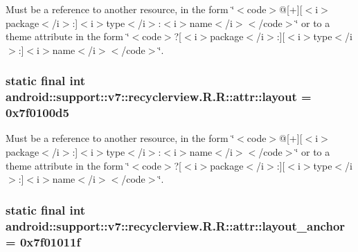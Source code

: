 Must be a reference to another resource, in the form \char`\"{}$<$code$>$@\mbox{[}+\mbox{]}\mbox{[}$<$i$>$package$<$/i$>$:\mbox{]}$<$i$>$type$<$/i$>$:$<$i$>$name$<$/i$>$$<$/code$>$\char`\"{} or to a theme attribute in the form \char`\"{}$<$code$>$?\mbox{[}$<$i$>$package$<$/i$>$:\mbox{]}\mbox{[}$<$i$>$type$<$/i$>$:\mbox{]}$<$i$>$name$<$/i$>$$<$/code$>$\char`\"{}. \hypertarget{classandroid_1_1support_1_1v7_1_1recyclerview_1_1_r_1_1attr_1b68afa3d9efed4db4b4035d66052220}{
\subsubsection[{layout}]{\setlength{\rightskip}{0pt plus 5cm}static final int android::support::v7::recyclerview.R.R::attr::layout = 0x7f0100d5}}
\label{classandroid_1_1support_1_1v7_1_1recyclerview_1_1_r_1_1attr_1b68afa3d9efed4db4b4035d66052220}


Must be a reference to another resource, in the form \char`\"{}$<$code$>$@\mbox{[}+\mbox{]}\mbox{[}$<$i$>$package$<$/i$>$:\mbox{]}$<$i$>$type$<$/i$>$:$<$i$>$name$<$/i$>$$<$/code$>$\char`\"{} or to a theme attribute in the form \char`\"{}$<$code$>$?\mbox{[}$<$i$>$package$<$/i$>$:\mbox{]}\mbox{[}$<$i$>$type$<$/i$>$:\mbox{]}$<$i$>$name$<$/i$>$$<$/code$>$\char`\"{}. \hypertarget{classandroid_1_1support_1_1v7_1_1recyclerview_1_1_r_1_1attr_8119ca28ef1636398a40c2d56e3d2e59}{
\subsubsection[{layout\_\-anchor}]{\setlength{\rightskip}{0pt plus 5cm}static final int android::support::v7::recyclerview.R.R::attr::layout\_\-anchor = 0x7f01011f}}
\label{classandroid_1_1support_1_1v7_1_1recyclerview_1_1_r_1_1attr_8119ca28ef1636398a40c2d56e3d2e59}


